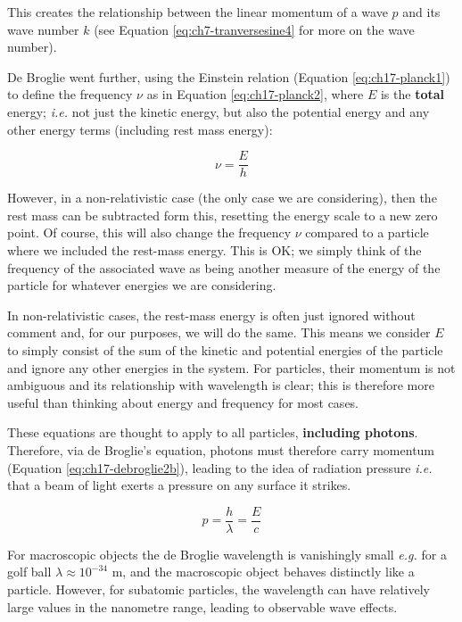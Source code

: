 \documentclass[
]{book}
\begin{document}
This creates the relationship between the linear momentum of a wave \(p\) and its wave number \(k\) (see Equation \eqref{eq:ch7-tranversesine4} for more on the wave number).

De Broglie went further, using the Einstein relation (Equation \eqref{eq:ch17-planck1}) to define the frequency \(\nu\) as in Equation \eqref{eq:ch17-planck2}, where \(E\) is the \textbf{total} energy; \emph{i.e.} not just the kinetic energy, but also the potential energy and any other energy terms (including rest mass energy):

\begin{equation}
\nu = \frac{E}{h}
\label{eq:ch17-planck2}
\end{equation}

However, in a non-relativistic case (the only case we are considering), then the rest mass can be subtracted form this, resetting the energy scale to a new zero point. Of course, this will also change the frequency \(\nu\) compared to a particle where we included the rest-mass energy. This is OK; we simply think of the frequency of the associated wave as being another measure of the energy of the particle for whatever energies we are considering.

In non-relativistic cases, the rest-mass energy is often just ignored without comment and, for our purposes, we will do the same. This means we consider \(E\) to simply consist of the sum of the kinetic and potential energies of the particle and ignore any other energies in the system. For particles, their momentum is not ambiguous and its relationship with wavelength is clear; this is therefore more useful than thinking about energy and frequency for most cases.

These equations are thought to apply to all particles, \textbf{including photons}. Therefore, via de Broglie's equation, photons must therefore carry momentum (Equation \eqref{eq:ch17-debroglie2b}), leading to the idea of radiation pressure \emph{i.e.} that a beam of light exerts a pressure on any surface it strikes.

\begin{equation}
p = \frac{h}{\lambda} = \frac{E}{c}
\label{eq:ch17-debroglie2b}
\end{equation}

For macroscopic objects the de Broglie wavelength is vanishingly small \emph{e.g.} for a golf ball \(\lambda \approx 10^{-34}\) m, and the macroscopic object behaves distinctly like a particle. However, for subatomic particles, the wavelength can have relatively large values in the nanometre range, leading to observable wave effects.
\end{document}

